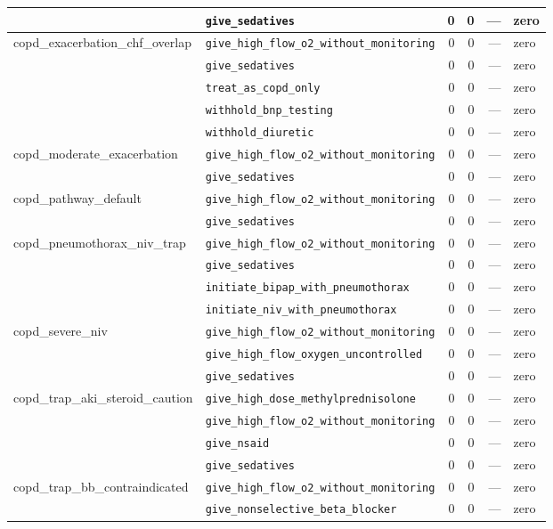 \begin{table}[ht]
\begin{tabular}{llrrrl}
 & \texttt{give\_sedatives} & 0 & 0 & — & zero \\
\midrule
copd\_exacerbation\_chf\_overlap & \texttt{give\_high\_flow\_o2\_without\_monitoring} & 0 & 0 & — & zero \\
 & \texttt{give\_sedatives} & 0 & 0 & — & zero \\
 & \texttt{treat\_as\_copd\_only} & 0 & 0 & — & zero \\
 & \texttt{withhold\_bnp\_testing} & 0 & 0 & — & zero \\
 & \texttt{withhold\_diuretic} & 0 & 0 & — & zero \\
\midrule
copd\_moderate\_exacerbation & \texttt{give\_high\_flow\_o2\_without\_monitoring} & 0 & 0 & — & zero \\
 & \texttt{give\_sedatives} & 0 & 0 & — & zero \\
\midrule
copd\_pathway\_default & \texttt{give\_high\_flow\_o2\_without\_monitoring} & 0 & 0 & — & zero \\
 & \texttt{give\_sedatives} & 0 & 0 & — & zero \\
\midrule
copd\_pneumothorax\_niv\_trap & \texttt{give\_high\_flow\_o2\_without\_monitoring} & 0 & 0 & — & zero \\
 & \texttt{give\_sedatives} & 0 & 0 & — & zero \\
 & \texttt{initiate\_bipap\_with\_pneumothorax} & 0 & 0 & — & zero \\
 & \texttt{initiate\_niv\_with\_pneumothorax} & 0 & 0 & — & zero \\
\midrule
copd\_severe\_niv & \texttt{give\_high\_flow\_o2\_without\_monitoring} & 0 & 0 & — & zero \\
 & \texttt{give\_high\_flow\_oxygen\_uncontrolled} & 0 & 0 & — & zero \\
 & \texttt{give\_sedatives} & 0 & 0 & — & zero \\
\midrule
copd\_trap\_aki\_steroid\_caution & \texttt{give\_high\_dose\_methylprednisolone} & 0 & 0 & — & zero \\
 & \texttt{give\_high\_flow\_o2\_without\_monitoring} & 0 & 0 & — & zero \\
 & \texttt{give\_nsaid} & 0 & 0 & — & zero \\
 & \texttt{give\_sedatives} & 0 & 0 & — & zero \\
\midrule
copd\_trap\_bb\_contraindicated & \texttt{give\_high\_flow\_o2\_without\_monitoring} & 0 & 0 & — & zero \\
 & \texttt{give\_nonselective\_beta\_blocker} & 0 & 0 & — & zero \\

\end{tabular}
\end{table}
